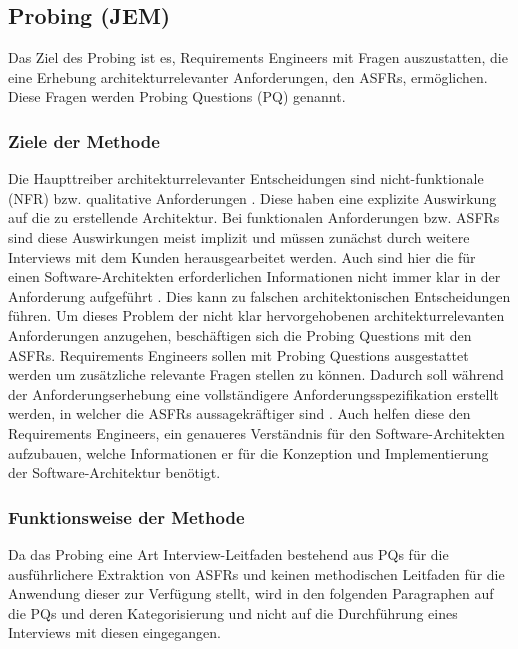 \subsection{Probing (JEM)}\label{probing}

Das Ziel des Probing ist es, Requirements Engineers mit Fragen auszustatten, die eine Erhebung architekturrelevanter Anforderungen, den ASFRs, erm\"oglichen. Diese Fragen werden Probing Questions (PQ) genannt. \\

\subsubsection{Ziele der Methode}

Die Haupttreiber architekturrelevanter Entscheidungen sind nicht-funktionale (NFR) bzw. qualitative Anforderungen \cite{Ros03}. Diese haben eine explizite Auswirkung auf die zu erstellende Architektur. Bei funktionalen Anforderungen bzw. ASFRs sind diese Auswirkungen meist implizit und m\"ussen zun\"achst durch weitere Interviews mit dem Kunden herausgearbeitet werden. Auch sind hier die f\"ur einen Software-Architekten erforderlichen Informationen nicht immer klar in der Anforderung aufgef\"uhrt \cite{Ros03}. Dies kann zu falschen architektonischen Entscheidungen f\"uhren. Um dieses Problem der nicht klar hervorgehobenen architekturrelevanten Anforderungen anzugehen, besch\"aftigen sich die Probing Questions mit den ASFRs. Requirements Engineers sollen mit Probing Questions ausgestattet werden um zus\"atzliche relevante Fragen stellen zu k\"onnen. Dadurch soll w\"ahrend der Anforderungserhebung eine vollst\"andigere Anforderungsspezifikation erstellt werden, in welcher die ASFRs aussagekr\"aftiger sind \cite{Ros03}. Auch helfen diese den Requirements Engineers, ein genaueres Verst\"andnis f\"ur den Software-Architekten aufzubauen, welche Informationen er f\"ur die Konzeption und Implementierung der Software-Architektur ben\"otigt. \\

\subsubsection{Funktionsweise der Methode}

Da das Probing eine Art Interview-Leitfaden bestehend aus PQs f\"ur die ausf\"uhrlichere Extraktion von ASFRs und keinen methodischen Leitfaden f\"ur die Anwendung dieser zur Verf\"ugung stellt, wird in den folgenden Paragraphen auf die PQs und deren Kategorisierung und nicht auf die Durchf\"uhrung eines Interviews mit diesen eingegangen. \\

